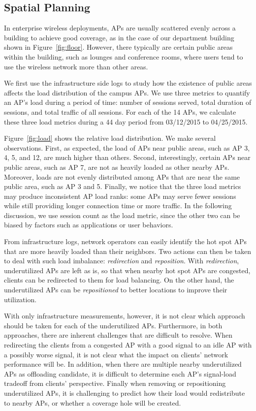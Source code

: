 \subsection{Spatial Planning}
\label{subsec:spatial}

In enterprise wireless deployments, APs are usually scattered evenly across a building
to achieve good coverage, as in the case of our department building shown in
Figure~\ref{fig:floor}. However, there typically are certain public areas within
the building, such as lounges and conference rooms, where users tend to use the
wireless network more than other areas.

We first use the infrastructure side logs to study how the existence of public
areas affects the load distribution of the campus APs. We use three metrics to
quantify an AP's load during a period of time: number of \wifi{} sessions
served, total duration of \wifi{} sessions, and total traffic of all sessions.
For each of the 14 APs, we calculate these three load metrics during a 44 day
period from 03/12/2015 to 04/25/2015.

Figure~\ref{fig:load} shows the relative load distribution. We make several
observations. First, as expected, the load of APs near public areas, such as AP
3, 4, 5, and 12, are much higher than others. Second, interestingly, certain APs
near public areas, such as AP 7, are not as heavily loaded as other nearby APs.
Moreover, loads are not evenly distributed among APs that are near the same
public area, such as AP 3 and 5. Finally, we notice that the three load metrics
may produce inconsistent AP load ranks: some APs may serve fewer \wifi{}
sessions while still providing longer connection time or more traffic. In the
following discussion, we use session count as the load metric, since the other
two can be biased by factors such as applications or user behaviors.

From infrastructure logs, network operators can easily identify the hot spot APs
that are more heavily loaded than their neighbors. Two actions can then be taken
to deal with such load imbalance: \textit{redirection} and \textit{reposition}.
With \textit{redirection}, underutilized APs are left as is, so that
when nearby hot spot APs are congested, clients can be redirected to them for
load balancing. On the other hand, the underutilized APs can be
\textit{repositioned} to better locations to improve their utilization.

With only infrastructure measurements, however, it is not clear which approach
should be taken for each of the underutilized APs. Furthermore, in both
approaches, there are inherent challenges that are difficult to resolve.  When
redirecting the clients from a congested AP with a good signal to an idle AP with
a possibly worse signal, it is not clear what the impact on clients' network
performance will be. In addition, when there are multiple nearby underutilized APs as
offloading candidate, it is difficult to determine each AP's signal-load
tradeoff from clients' perspective. Finally when removing or repositioning
underutilized APs, it is challenging to predict how their load would
redistribute to nearby APs, or whether a coverage hole will be created.


